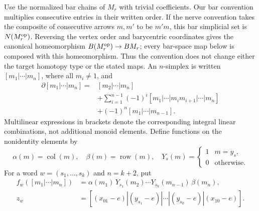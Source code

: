 Use the normalized bar chains of $M_r$ with trivial coefficients.
Our bar convention multiplies consecutive entries in their written
order.  If the nerve convention takes the composite of consecutive
arrows $m,m'$ to be $m'm$, this bar simplicial set is $N(M_r^{\mathrm{op}})$.
Reversing the vertex order and barycentric coordinates gives the
canonical homeomorphism $B(M_r^{\mathrm{op}})\to BM_r$; every bar-space map
below is composed with this homeomorphism.  Thus the convention does
not change either the target homotopy type or the stated maps.
An
$n$-simplex is written $[m_1|\cdots|m_n]$, where all $m_i\ne1$, and
\[
 \begin{split}
 \partial[m_1|\cdots|m_n]={}&[m_2|\cdots|m_n]\\
 &+\sum_{i=1}^{n-1}(-1)^i
 [m_1|\cdots|m_im_{i+1}|\cdots|m_n]\\
 &+(-1)^n[m_1|\cdots|m_{n-1}].
 \end{split}
\]
Multilinear expressions in brackets denote the corresponding integral
linear combinations, not additional monoid elements.  Define functions
on the nonidentity elements by
\[
 \alpha(m)=\operatorname{col}(m),\quad
 \beta(m)=\operatorname{row}(m),\quad
 Y_s(m)=\begin{cases}1&m=y_s,\\0&\text{otherwise}.
 \end{cases}
\]
For a word $w=(s_1,\ldots,s_k)$ and $n=k+2$, put
\[
 \begin{split}
 f_w([m_1|\cdots|m_n])
   &=\alpha(m_1)\,Y_{s_1}(m_2)\cdots
                 Y_{s_k}(m_{n-1})\,\beta(m_n),\\
 z_w&=[(x_{01}-e)|(y_{s_1}-e)|\cdots|
                (y_{s_k}-e)|(x_{10}-e)].
 \end{split}
\]

